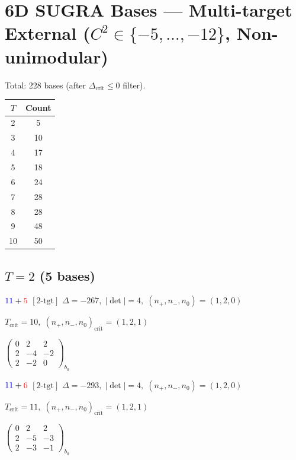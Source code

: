 \documentclass[10pt]{article}
\begin{document}
\section*{6D SUGRA Bases --- Multi-target External ($C^2 \in \{-5,\ldots,-12\}$, Non-unimodular)}

Total: 228 bases (after $\Delta_{\text{crit}} \leq 0$ filter).

\begin{center}
\begin{tabular}{c|c}
\toprule
$T$ & Count \\
\midrule
2 & 5 \\
3 & 10 \\
4 & 17 \\
5 & 18 \\
6 & 24 \\
7 & 28 \\
8 & 28 \\
9 & 48 \\
10 & 50 \\
\bottomrule
\end{tabular}
\end{center}

\newpage

\subsection*{$T = 2$ \quad (5 bases)}
\smallskip

$\textcolor{blue}{1}\textcolor{blue}{1}+\textcolor{red}{5}$ $\scriptstyle [2\text{-tgt}]$ \quad $\Delta=-267,\; |\det|=4,\; (n_+,n_-,n_0)=(1,2,0)$

\hspace{1em}$T_{\text{crit}}=10,\; (n_+,n_-,n_0)_{\text{crit}}=(1,2,1)$

\hspace{2em}$\left(\begin{smallmatrix}0 & 2 & 2 \\ 2 & -4 & -2 \\ 2 & -2 & 0\end{smallmatrix}\right)_{\!b_0}$

$\textcolor{blue}{1}\textcolor{blue}{1}+\textcolor{red}{6}$ $\scriptstyle [2\text{-tgt}]$ \quad $\Delta=-293,\; |\det|=4,\; (n_+,n_-,n_0)=(1,2,0)$

\hspace{1em}$T_{\text{crit}}=11,\; (n_+,n_-,n_0)_{\text{crit}}=(1,2,1)$

\hspace{2em}$\left(\begin{smallmatrix}0 & 2 & 2 \\ 2 & -5 & -3 \\ 2 & -3 & -1\end{smallmatrix}\right)_{\!b_0}$
\end{document}
